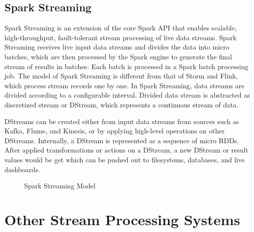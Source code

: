 \subsection{Spark Streaming}

Spark Streaming is an extension of the core Spark API that enables scalable, high-throughput, fault-tolerant stream processing of live data streams. Spark Streaming receives live input data streams and divides the data into micro batches, which are then processed by the Spark engine to generate the final stream of results in batches. Each batch is processed in a Spark batch processing job. The model of Spark Streaming is different from that of Storm and Flink, which process stream records one by one. In Spark Streaming, data streams are divided according to a configurable interval. Divided data stream is abstracted as discretized stream or DStream, which represents a continuous stream of data. 

DStreams can be created either from input data streams from sources such as Kafka, Flume, and Kinesis, or by applying high-level operations on other DStreams. Internally, a DStream is represented as a sequence of micro RDDs. After applied transformations or actions on a DStream, a new DStream or result values would be get which can be pushed out to filesystems, databases, and live dashboards.

\begin{figure}
  \begin{center}
   \caption{Spark Streaming Model}
   \label{fig:spark_stream}
  \end{center}
\end{figure}

\section{Other Stream Processing Systems}
